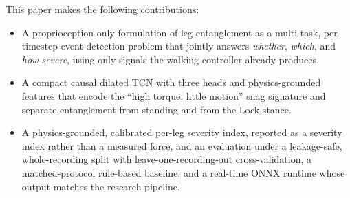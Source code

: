 This paper makes the following contributions:
\begin{itemize}
  \item A proprioception-only formulation of leg entanglement as a multi-task, per-timestep event-detection problem that jointly answers \emph{whether}, \emph{which}, and \emph{how-severe}, using only signals the walking controller already produces.
  \item A compact causal dilated TCN with three heads and physics-grounded features that encode the ``high torque, little motion'' snag signature and separate entanglement from standing and from the Lock stance.
  \item A physics-grounded, calibrated per-leg severity index, reported as a severity index rather than a measured force, and an evaluation under a leakage-safe, whole-recording split with leave-one-recording-out cross-validation, a matched-protocol rule-based baseline, and a real-time ONNX runtime whose output matches the research pipeline.
\end{itemize}

